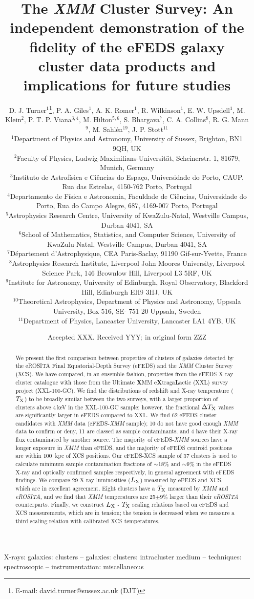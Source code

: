 \documentclass[fleqn,usenatbib]{mnras}
\title[XCS follow-up of eFEDS selected cluster candidates]{The {\em XMM} Cluster Survey: An independent demonstration of the fidelity of the eFEDS galaxy cluster data products and implications for future studies}
\author[D. J. Turner et al.]
{D. J. Turner$^{1}$\thanks{E-mail: david.turner@sussex.ac.uk (DJT)}\orcidA{},
P. A. Giles$^{1}$\orcidB{},
A. K. Romer$^{1}$\orcidC{},
R. Wilkinson$^{1}$\orcidD{},
E. W. Upsdell$^{1}$\orcidG{},
M. Klein$^{2}$,
\newauthor
P. T. P. Viana$^{3,4}$\orcidE{},
M. Hilton$^{5,6}$\orcidJ{},
S. Bhargava$^{7}$,
C. A. Collins$^{8}$,
R. G. Mann$^{9}$\orcidH{},
M. Sahl\'en$^{19}$\orcidI{},
J. P. Stott$^{11}$\orcidF{}
\\
$^{1}$Department of Physics and Astronomy, University of Sussex, Brighton, BN1 9QH, UK\\
$^{2}$Faculty of Physics, Ludwig-Maximilians-Universität, Scheinerstr. 1, 81679, Munich, Germany\\
$^{3}$Instituto de Astrof\'isica e Ci\^{e}ncias do Espa\c co, Universidade do Porto, CAUP, Rua das Estrelas, 4150-762 Porto, Portugal \\
$^{4}$Departamento de F\'isica e Astronomia, Faculdade de Ci\^{e}ncias, Universidade do Porto, Rua do Campo Alegre, 687, 4169-007 Porto, Portugal \\
$^{5}$Astrophysics Research Centre, University of KwaZulu-Natal, Westville Campus, Durban 4041, SA \\
$^{6}$School of Mathematics, Statistics, and Computer Science, University of KwaZulu-Natal, Westville Campus, Durban 4041, SA \\
$^{7}$Département d’Astrophysique, CEA Paris-Saclay, 91190 Gif-sur-Yvette, France\\
$^{8}$Astrophysics Research Institute, Liverpool John Moores University, Liverpool Science Park, 146 Brownlow Hill, Liverpool L3 5RF, UK \\
$^{9}$Institute for Astronomy, University of Edinburgh, Royal Observatory, Blackford Hill, Edinburgh EH9 3HJ, UK \\
$^{10}$Theoretical Astrophysics, Department of Physics and Astronomy, Uppsala University, Box 516, SE- 751 20 Uppsala, Sweden\\
$^{11}$Department of Physics, Lancaster University, Lancaster LA1 4YB, UK 
}
\date{Accepted XXX. Received YYY; in original form ZZZ}
\begin{document}
\label{firstpage}
\pagerange{\pageref{firstpage}--\pageref{lastpage}}
\maketitle

\begin{abstract}
We present the first comparison between properties of clusters of galaxies detected by the eROSITA Final Equatorial-Depth Survey (eFEDS) and the {\em XMM} Cluster Survey (XCS). We have compared, in an ensemble fashion, properties from the eFEDS X-ray cluster catalogue with those from the Ultimate {\bf X}MM e{\bf X}traga{\bf L}actic (XXL) survey project (XXL-100-GC). We find the distributions of redshift and X-ray temperature ($T_{\rm X}$) to be broadly similar between the two surveys, with a larger proportion of clusters above 4\,keV in the XXL-100-GC sample; however, the fractional $\Delta T_{\rm X}$ values are significantly larger in eFEDS compared to XXL. We find 62 eFEDS cluster candidates with {\em XMM} data (eFEDS-{\em XMM} sample); 10 do not have good enough {\em XMM} data to confirm or deny, 11 are classed as sample contaminants, and 4 have their X-ray flux contaminated by another source. The majority of eFEDS-{\em XMM} sources have a longer exposure in {\em XMM} than eFEDS, and the majority of eFEDS centroid positions are within 100~kpc of XCS positions. Our eFEDS-XCS sample of 37 clusters is used to calculate minimum sample contamination fractions of ${\sim}$18\% and ${\sim}$9\% in the eFEDS X-ray and optically confirmed samples respectively, in general agreement with eFEDS findings. We compare 29 X-ray luminosities ($L_{\rm X}$) measured by eFEDS and XCS, which are in excellent agreement. Eight clusters have a $T_{\rm X}$ measured by {\em XMM} and {\em eROSITA}, and we find that {\em XMM} temperatures are 25$\pm$9\% larger than their {\em eROSITA} counterparts. Finally, we construct $L_{\rm X}$ - $T_{\rm X}$ scaling relations based on eFEDS and XCS measurements, which are in tension; the tension is decreased when we measure a third scaling relation with calibrated XCS temperatures.

\end{abstract}

\begin{keywords}
X-rays: galaxies: clusters -- galaxies: clusters: intracluster medium -- techniques: spectroscopic -- instrumentation: miscellaneous
\end{keywords}
\end{document}
